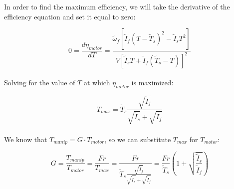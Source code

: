 \documentclass[a4paper]{article}
\begin{document}
	\newpage
	In order to find the maximum efficiency, we will take the derivative of the efficiency equation and set it equal to zero:
	
	\begin{equation}
		0 = \frac{d \eta_{motor}}{dT} = \frac{\widetilde{\omega}_f \left[ \widetilde{I}_f (T - \widetilde{T}_s)^2 - \widetilde{I}_s T^2 \right]}{V \left[ \widetilde{I}_s T + \widetilde{I}_f (\widetilde{T}_s - T) \right]^2}
	\end{equation}\\
	
	Solving for the value of $ T $ at which $ \eta_{motor} $ is maximized:
	
	\begin{equation}
		T_{max} = \widetilde{T}_s \frac{\sqrt{\widetilde{I}_f}}{\sqrt{\widetilde{I}_s} + \sqrt{\widetilde{I}_f}}
	\end{equation}\\
	
	We know that $ T_{manip} = G \cdot T_{motor} $, so we can substitute $ T_{max} $ for $ T_{motor} $:
	
	\begin{equation}
		G = \frac{T_{manip}}{T_{motor}} = \frac{F r}{T_{max}}
		= \frac{F r}{\widetilde{T}_s \frac{\sqrt{\widetilde{I}_f}}{\sqrt{\widetilde{I}_s} + \sqrt{\widetilde{I}_f}}}
		= \frac{F r}{\widetilde{T}_s} \left( 1 + \sqrt{\frac{\widetilde{I}_s}{\widetilde{I}_f}} \right)
	\end{equation}
	
	
	
	
	
\end{document}

